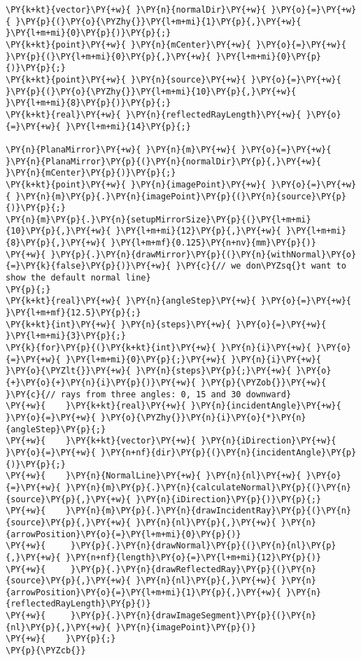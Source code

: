 \begin{Verbatim}[commandchars=\\\{\}]
\PY{k+kt}{vector}\PY{+w}{ }\PY{n}{normalDir}\PY{+w}{ }\PY{o}{=}\PY{+w}{ }\PY{p}{(}\PY{o}{\PYZhy{}}\PY{l+m+mi}{1}\PY{p}{,}\PY{+w}{ }\PY{l+m+mi}{0}\PY{p}{)}\PY{p}{;}
\PY{k+kt}{point}\PY{+w}{ }\PY{n}{mCenter}\PY{+w}{ }\PY{o}{=}\PY{+w}{ }\PY{p}{(}\PY{l+m+mi}{0}\PY{p}{,}\PY{+w}{ }\PY{l+m+mi}{0}\PY{p}{)}\PY{p}{;}
\PY{k+kt}{point}\PY{+w}{ }\PY{n}{source}\PY{+w}{ }\PY{o}{=}\PY{+w}{ }\PY{p}{(}\PY{o}{\PYZhy{}}\PY{l+m+mi}{10}\PY{p}{,}\PY{+w}{ }\PY{l+m+mi}{8}\PY{p}{)}\PY{p}{;}
\PY{k+kt}{real}\PY{+w}{ }\PY{n}{reflectedRayLength}\PY{+w}{ }\PY{o}{=}\PY{+w}{ }\PY{l+m+mi}{14}\PY{p}{;}

\PY{n}{PlanaMirror}\PY{+w}{ }\PY{n}{m}\PY{+w}{ }\PY{o}{=}\PY{+w}{ }\PY{n}{PlanaMirror}\PY{p}{(}\PY{n}{normalDir}\PY{p}{,}\PY{+w}{ }\PY{n}{mCenter}\PY{p}{)}\PY{p}{;}
\PY{k+kt}{point}\PY{+w}{ }\PY{n}{imagePoint}\PY{+w}{ }\PY{o}{=}\PY{+w}{ }\PY{n}{m}\PY{p}{.}\PY{n}{imagePoint}\PY{p}{(}\PY{n}{source}\PY{p}{)}\PY{p}{;}
\PY{n}{m}\PY{p}{.}\PY{n}{setupMirrorSize}\PY{p}{(}\PY{l+m+mi}{10}\PY{p}{,}\PY{+w}{ }\PY{l+m+mi}{12}\PY{p}{,}\PY{+w}{ }\PY{l+m+mi}{8}\PY{p}{,}\PY{+w}{ }\PY{l+m+mf}{0.125}\PY{n+nv}{mm}\PY{p}{)}
\PY{+w}{ }\PY{p}{.}\PY{n}{drawMirror}\PY{p}{(}\PY{n}{withNormal}\PY{o}{=}\PY{k}{false}\PY{p}{)}\PY{+w}{ }\PY{c}{// we don\PYZsq{}t want to show the default normal line}
\PY{p}{;}
\PY{k+kt}{real}\PY{+w}{ }\PY{n}{angleStep}\PY{+w}{ }\PY{o}{=}\PY{+w}{ }\PY{l+m+mf}{12.5}\PY{p}{;}
\PY{k+kt}{int}\PY{+w}{ }\PY{n}{steps}\PY{+w}{ }\PY{o}{=}\PY{+w}{ }\PY{l+m+mi}{3}\PY{p}{;}
\PY{k}{for}\PY{p}{(}\PY{k+kt}{int}\PY{+w}{ }\PY{n}{i}\PY{+w}{ }\PY{o}{=}\PY{+w}{ }\PY{l+m+mi}{0}\PY{p}{;}\PY{+w}{ }\PY{n}{i}\PY{+w}{ }\PY{o}{\PYZlt{}}\PY{+w}{ }\PY{n}{steps}\PY{p}{;}\PY{+w}{ }\PY{o}{+}\PY{o}{+}\PY{n}{i}\PY{p}{)}\PY{+w}{ }\PY{p}{\PYZob{}}\PY{+w}{ }\PY{c}{// rays from three angles: 0, 15 and 30 downward}
\PY{+w}{    }\PY{k+kt}{real}\PY{+w}{ }\PY{n}{incidentAngle}\PY{+w}{ }\PY{o}{=}\PY{+w}{ }\PY{o}{\PYZhy{}}\PY{n}{i}\PY{o}{*}\PY{n}{angleStep}\PY{p}{;}
\PY{+w}{    }\PY{k+kt}{vector}\PY{+w}{ }\PY{n}{iDirection}\PY{+w}{ }\PY{o}{=}\PY{+w}{ }\PY{n+nf}{dir}\PY{p}{(}\PY{n}{incidentAngle}\PY{p}{)}\PY{p}{;}
\PY{+w}{    }\PY{n}{NormalLine}\PY{+w}{ }\PY{n}{nl}\PY{+w}{ }\PY{o}{=}\PY{+w}{ }\PY{n}{m}\PY{p}{.}\PY{n}{calculateNormal}\PY{p}{(}\PY{n}{source}\PY{p}{,}\PY{+w}{ }\PY{n}{iDirection}\PY{p}{)}\PY{p}{;}
\PY{+w}{    }\PY{n}{m}\PY{p}{.}\PY{n}{drawIncidentRay}\PY{p}{(}\PY{n}{source}\PY{p}{,}\PY{+w}{ }\PY{n}{nl}\PY{p}{,}\PY{+w}{ }\PY{n}{arrowPosition}\PY{o}{=}\PY{l+m+mi}{0}\PY{p}{)}
\PY{+w}{     }\PY{p}{.}\PY{n}{drawNormal}\PY{p}{(}\PY{n}{nl}\PY{p}{,}\PY{+w}{ }\PY{n+nf}{length}\PY{o}{=}\PY{l+m+mi}{12}\PY{p}{)}
\PY{+w}{     }\PY{p}{.}\PY{n}{drawReflectedRay}\PY{p}{(}\PY{n}{source}\PY{p}{,}\PY{+w}{ }\PY{n}{nl}\PY{p}{,}\PY{+w}{ }\PY{n}{arrowPosition}\PY{o}{=}\PY{l+m+mi}{1}\PY{p}{,}\PY{+w}{ }\PY{n}{reflectedRayLength}\PY{p}{)}
\PY{+w}{     }\PY{p}{.}\PY{n}{drawImageSegment}\PY{p}{(}\PY{n}{nl}\PY{p}{,}\PY{+w}{ }\PY{n}{imagePoint}\PY{p}{)}
\PY{+w}{    }\PY{p}{;}
\PY{p}{\PYZcb{}}


\end{Verbatim}

